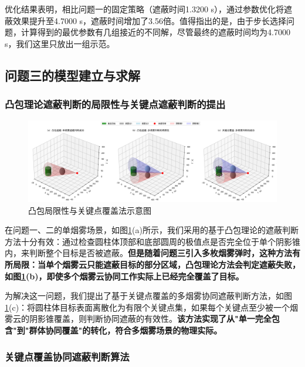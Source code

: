 \documentclass[fontset=SimSun]{ctexart}
\begin{document}
优化结果表明，相比问题一的固定策略（遮蔽时间1.3200 s），通过参数优化将遮蔽效果提升至4.7000 s，遮蔽时间增加了3.56倍。值得指出的是，由于步长选择问题，计算得到的最优参数有几组接近的不同解，尽管最终的遮蔽时间均为4.7000 s，我们这里只放出一组示范。
\subsection{问题三的模型建立与求解}

\subsubsection{凸包理论遮蔽判断的局限性与关键点遮蔽判断的提出}

\begin{figure}[H]
    \centering
    \includegraphics[width=\textwidth]{3.凸集局限与关键点覆盖对比图.png}
    \caption{凸包局限性与关键点覆盖法示意图}
    \label{fig:obscuration_cases}
\end{figure}

在问题一、二的单烟雾场景，如图\ref{fig:obscuration_cases}(a)所示，我们采用的基于凸包理论的遮蔽判断方法十分有效：通过检查圆柱体顶部和底部圆周的极值点是否完全位于单个阴影锥内，来判断整个目标是否被遮蔽。\textbf{但是随着问题三引入多枚烟雾弹时，这种方法有所局限：当单个烟雾云只能遮蔽目标的部分区域，凸包理论方法会判定遮蔽失败，如图\ref{fig:obscuration_cases}(b)，即使多个烟雾云协同工作实际上已经完全覆盖了目标。}

为解决这一问题，我们提出了基于关键点覆盖的多烟雾协同遮蔽判断方法，如图\ref{fig:obscuration_cases}(c)：将圆柱体目标表面离散化为有限个关键点集，如果每个关键点至少被一个烟雾云的阴影锥覆盖，则判断协同遮蔽的有效性。\textbf{该方法实现了从"单一完全包含"到"群体协同覆盖"的转化，符合多烟雾场景的物理实际。}

\subsubsection{关键点覆盖协同遮蔽判断算法}
\end{document}
